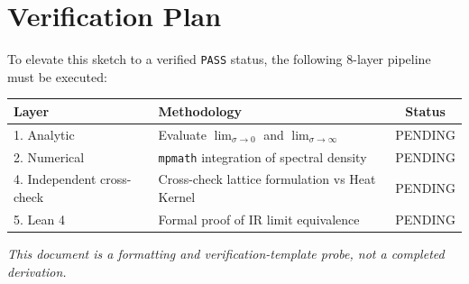 \documentclass[11pt,a4paper]{article}
\begin{document}
\section{Verification Plan}

To elevate this sketch to a verified \texttt{PASS} status, the following
8-layer pipeline must be executed:

\begin{center}
\renewcommand{\arraystretch}{1.2}
\begin{tabular}{llc}
  \toprule
  \textbf{Layer} & \textbf{Methodology} & \textbf{Status} \\
  \midrule
  1. Analytic & Evaluate $\lim_{\sigma\to 0}$ and $\lim_{\sigma\to\infty}$ & \textcolor{pending}{PENDING} \\
  2. Numerical & \texttt{mpmath} integration of spectral density & \textcolor{pending}{PENDING} \\
  4. Independent cross-check & Cross-check lattice formulation vs Heat Kernel & \textcolor{pending}{PENDING} \\
  5. Lean 4 & Formal proof of IR limit equivalence & \textcolor{pending}{PENDING} \\
  \bottomrule
\end{tabular}
\end{center}

\vspace{1em}
\noindent
\textit{This document is a formatting and verification-template probe, not a completed derivation.}
\end{document}
